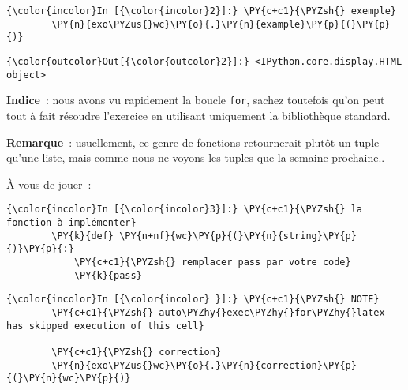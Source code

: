     \begin{Verbatim}[commandchars=\\\{\},frame=single,framerule=0.3mm,rulecolor=\color{cellframecolor}]
{\color{incolor}In [{\color{incolor}2}]:} \PY{c+c1}{\PYZsh{} exemple}
        \PY{n}{exo\PYZus{}wc}\PY{o}{.}\PY{n}{example}\PY{p}{(}\PY{p}{)}
\end{Verbatim}


\begin{Verbatim}[commandchars=\\\{\},frame=single,framerule=0.3mm,rulecolor=\color{cellframecolor}]
{\color{outcolor}Out[{\color{outcolor}2}]:} <IPython.core.display.HTML object>
\end{Verbatim}
            
    \textbf{Indice}~: nous avons vu rapidement la boucle \texttt{for},
sachez toutefois qu'on peut tout à fait résoudre l'exercice en utilisant
uniquement la bibliothèque standard.

\textbf{Remarque}~: usuellement, ce genre de fonctions retournerait
plutôt un tuple qu'une liste, mais comme nous ne voyons les tuples que
la semaine prochaine..

    À vous de jouer~:

    \begin{Verbatim}[commandchars=\\\{\},frame=single,framerule=0.3mm,rulecolor=\color{cellframecolor}]
{\color{incolor}In [{\color{incolor}3}]:} \PY{c+c1}{\PYZsh{} la fonction à implémenter}
        \PY{k}{def} \PY{n+nf}{wc}\PY{p}{(}\PY{n}{string}\PY{p}{)}\PY{p}{:}
            \PY{c+c1}{\PYZsh{} remplacer pass par votre code}
            \PY{k}{pass}
\end{Verbatim}


    \begin{Verbatim}[commandchars=\\\{\},frame=single,framerule=0.3mm,rulecolor=\color{cellframecolor}]
{\color{incolor}In [{\color{incolor} }]:} \PY{c+c1}{\PYZsh{} NOTE}
        \PY{c+c1}{\PYZsh{} auto\PYZhy{}exec\PYZhy{}for\PYZhy{}latex has skipped execution of this cell}
        
        \PY{c+c1}{\PYZsh{} correction}
        \PY{n}{exo\PYZus{}wc}\PY{o}{.}\PY{n}{correction}\PY{p}{(}\PY{n}{wc}\PY{p}{)}
\end{Verbatim}



    
    
    
